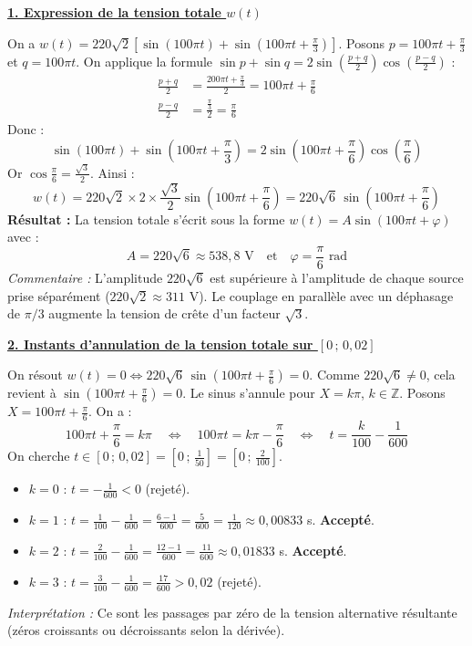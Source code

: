 \documentclass[11pt]{article}
\begin{document}
\begin{exoresolu}
\underline{\textbf{1. Expression de la tension totale $w(t)$}}

On a $w(t) = 220\sqrt{2}\left[ \sin(100\pi t) + \sin\!\left(100\pi t + \frac{\pi}{3}\right) \right]$.
Posons $p = 100\pi t + \frac{\pi}{3}$ et $q = 100\pi t$.
On applique la formule $\sin p + \sin q = 2\sin\!\left(\frac{p+q}{2}\right)\cos\!\left(\frac{p-q}{2}\right)$ :
\begin{align*}
\frac{p+q}{2} &= \frac{200\pi t + \frac{\pi}{3}}{2} = 100\pi t + \frac{\pi}{6} \\
\frac{p-q}{2} &= \frac{\frac{\pi}{3}}{2} = \frac{\pi}{6}
\end{align*}
Donc :
\[ \sin(100\pi t) + \sin\!\left(100\pi t + \frac{\pi}{3}\right) = 2\sin\!\left(100\pi t + \frac{\pi}{6}\right)\cos\!\left(\frac{\pi}{6}\right) \]
Or $\cos\frac{\pi}{6} = \frac{\sqrt{3}}{2}$. Ainsi :
\[ w(t) = 220\sqrt{2} \times 2 \times \frac{\sqrt{3}}{2} \sin\!\left(100\pi t + \frac{\pi}{6}\right) = 220\sqrt{6}\,\sin\!\left(100\pi t + \frac{\pi}{6}\right) \]
\textbf{Résultat :} La tension totale s'écrit sous la forme $w(t) = A\sin(100\pi t + \varphi)$ avec :
\[ \boxed{A = 220\sqrt{6} \approx 538,8 \text{ V}} \quad \text{et} \quad \boxed{\varphi = \frac{\pi}{6} \text{ rad}} \]
\emph{Commentaire :} L'amplitude $220\sqrt{6}$ est supérieure à l'amplitude de chaque source prise séparément ($220\sqrt{2} \approx 311$ V). Le couplage en parallèle avec un déphasage de $\pi/3$ augmente la tension de crête d'un facteur $\sqrt{3}$.

\bigskip
\underline{\textbf{2. Instants d'annulation de la tension totale sur $[0\,;\, 0,02]$}}

On résout $w(t) = 0 \Leftrightarrow 220\sqrt{6}\,\sin\!\left(100\pi t + \frac{\pi}{6}\right) = 0$.
Comme $220\sqrt{6} \neq 0$, cela revient à $\sin\!\left(100\pi t + \frac{\pi}{6}\right) = 0$.
Le sinus s'annule pour $X = k\pi$, $k\in\mathbb{Z}$.
Posons $X = 100\pi t + \frac{\pi}{6}$. On a :
\[ 100\pi t + \frac{\pi}{6} = k\pi \quad \Leftrightarrow \quad 100\pi t = k\pi - \frac{\pi}{6} \quad \Leftrightarrow \quad t = \frac{k}{100} - \frac{1}{600} \]
On cherche $t \in [0\,;\, 0,02] = [0\,;\, \frac{1}{50}] = [0\,;\, \frac{2}{100}]$.
\begin{itemize}
    \item $k = 0$ : $t = -\frac{1}{600} < 0$ (rejeté).
    \item $k = 1$ : $t = \frac{1}{100} - \frac{1}{600} = \frac{6-1}{600} = \frac{5}{600} = \frac{1}{120} \approx 0,00833$ s. \textbf{Accepté}.
    \item $k = 2$ : $t = \frac{2}{100} - \frac{1}{600} = \frac{12-1}{600} = \frac{11}{600} \approx 0,01833$ s. \textbf{Accepté}.
    \item $k = 3$ : $t = \frac{3}{100} - \frac{1}{600} = \frac{17}{600} > 0,02$ (rejeté).
\end{itemize}
\emph{Interprétation :} Ce sont les passages par zéro de la tension alternative résultante (zéros croissants ou décroissants selon la dérivée).


\end{exoresolu}
\end{document}
